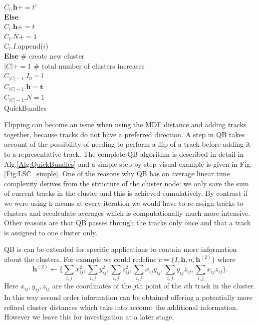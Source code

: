 \documentclass[preprint,authoryear,a4paper,10pt,onecolumn]{elsarticle}
\begin{document}
\begin{algorithm}
\hspace*{4em} $C_{l}.\mathbf{h}+=t'$\\
\hspace*{2em} $\textbf{Else}$ \\
\hspace*{4em} $C_{l}.\mathbf{h}+=t$\\
\hspace*{2em} $C_{l}.N+=1$\\
\hspace*{2em} $C_{l}.I$.append($i$)\\
$\textbf{Else}$ \# create new cluster\\
\hspace*{2em} $|C|+=1$ \# total number of clusters increases\\
\hspace*{2em} $C_{|C|-1}.I_{0}=l$\\
\hspace*{2em} $C_{|C|-1}.\mathbf{h}=\mathbf{t}$\\
\hspace*{2em} $C_{|C|-1}.N=1$\\
\caption{QuickBundles\label{Alg:QuickBundles}}
\end{algorithm}

Flipping can become an issue when using the MDF distance and adding
tracks together, because tracks do not have a preferred direction.  A
step in QB takes account of the possibility of needing to perform a flip
of a track before adding it to a representative track. The complete QB
algorithm is described in detail in Alg.\ref{Alg:QuickBundles} and a
simple step by step visual example is given in Fig. \ref{Fig:LSC_simple}.
One of the reasons why QB has on average linear time complexity derives
from the structure of the cluster node: we only save the sum of current
tracks in the cluster and this is achieved cumulatively. By contrast if
we were using k-means at every iteration we would have to re-assign
tracks to clusters and recalculate averages which is computationally
much more intensive. Other reasons are that QB passes through the tracks
only once and that a track is assigned to one cluster only.

QB is can be extended for specific applications to contain more information
about the clusters. For example we could redefine $c=\{I,\mathbf{h},n,\mathbf{h}^{(2)}\}$
where 
$$\mathbf{h}^{(2)}\leftarrow\{\sum_{i,j}x_{ij}^{2},\sum_{i,j}y_{ij}^{2},\sum_{i,j}z_{ij}^{2},\sum_{i,j}x_{ij}y_{ij},\sum_{i,j}y_{ij}z_{ij},\sum_{i,j}x_{ij}z_{ij}\}.$$
Here $x_{ij},y_{ij},z_{ij}$ are the coordinates of the $j$th point of
the $i$th track in the cluster. In this way second order information can
be obtained offering a potentially more refined cluster distances which
take into account the additional information. However we leave this for
investigation at a later stage.
\end{document}
